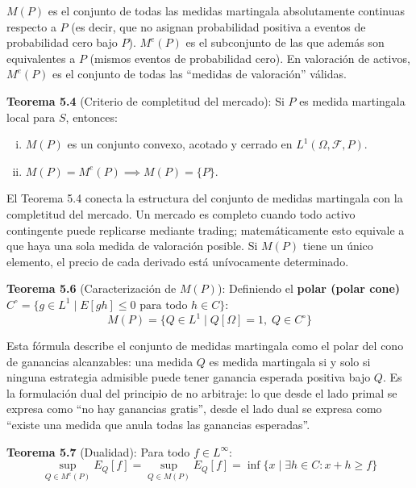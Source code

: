 \documentclass[12pt]{article}
\begin{document}
\begin{intuicionmat}
$M(P)$ es el conjunto de todas las medidas martingala absolutamente continuas respecto a $P$ (es decir, que no asignan probabilidad positiva a eventos de probabilidad cero bajo $P$). $M^e(P)$ es el subconjunto de las que adem\'as son equivalentes a $P$ (mismos eventos de probabilidad cero). En valoraci\'on de activos, $M^e(P)$ es el conjunto de todas las ``medidas de valoraci\'on'' v\'alidas.
\end{intuicionmat}

\textbf{Teorema 5.4} (Criterio de completitud del mercado): Si $P$ es medida martingala local para $S$, entonces:
\begin{enumerate}[(i)]
    \item $M(P)$ es un conjunto convexo, acotado y cerrado en $L^1(\Omega, \mathscr{F}, P)$.
    \item $M(P) = M^e(P) \implies M(P) = \{P\}$.
\end{enumerate}

\begin{intuicion}
El Teorema 5.4 conecta la estructura del conjunto de medidas martingala con la completitud del mercado. Un mercado es completo cuando todo activo contingente puede replicarse mediante trading; matem\'aticamente esto equivale a que haya una sola medida de valoraci\'on posible. Si $M(P)$ tiene un \'unico elemento, el precio de cada derivado est\'a un\'ivocamente determinado.
\end{intuicion}

\textbf{Teorema 5.6} (Caracterizaci\'on de $M(P)$): Definiendo el \textbf{polar (polar cone)} $C^\circ = \{g \in L^1 \mid E[gh] \leq 0 \text{ para todo } h \in C\}$:
\begin{equation}
    M(P) = \{Q \in L^1 \mid Q[\Omega] = 1,\; Q \in C^\circ\}
\end{equation}

\begin{intuicionmat}
Esta f\'ormula describe el conjunto de medidas martingala como el polar del cono de ganancias alcanzables: una medida $Q$ es medida martingala si y solo si ninguna estrategia admisible puede tener ganancia esperada positiva bajo $Q$. Es la formulaci\'on dual del principio de no arbitraje: lo que desde el lado primal se expresa como ``no hay ganancias gratis'', desde el lado dual se expresa como ``existe una medida que anula todas las ganancias esperadas''.
\end{intuicionmat}

\textbf{Teorema 5.7} (Dualidad): Para todo $f \in L^\infty$:
\begin{equation}
    \sup_{Q \in M^e(P)} E_Q[f] = \sup_{Q \in M(P)} E_Q[f] = \inf\{x \mid \exists h \in C : x + h \geq f\}
\end{equation}
\end{document}
